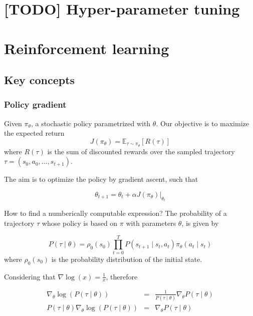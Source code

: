 \documentclass[12pt, english]{article}
\begin{document}
\section{[TODO] Hyper-parameter tuning}




\section{Reinforcement learning}

\subsection{Key concepts}

\subsubsection{Policy gradient}

Given $\pi_\theta$, a stochastic policy parametrized with $\theta$. Our objective is to maximize the expected return
\begin{equation}
  \label{eqn_expected_return}
  J(\pi_\theta) = \mathbb{E}_{\tau \sim \pi_\theta} [R(\tau)]
\end{equation}
%
where $R(\tau)$ is the sum of discounted rewards over the sampled trajectory $\tau = (s_0, a_0, \dots, s_{t+1})$.

The aim is to optimize the policy by gradient ascent, such that

\begin{equation}
  \theta_{t+1} = \theta_t + \alpha J(\pi_\theta)\Bigr|_{\theta_t}
\end{equation}

How to find a numberically computable expression? The probability of a trajectory $\tau$ whose policy is based on $\pi$ with parameters $\theta$, is given by

\begin{equation}
  \label{eqn_trajectory_probability}
  P(\tau \mid \theta) = \rho_0 (s_0) \prod_{t=0}^T P(s_{t+1} \mid s_t, a_t) \pi_\theta (a_t \mid s_t)
\end{equation}
%
where $\rho_0 (s_0)$ is the probability distribution of the initial state.

Considering that $\nabla \log (x) = \frac{1}{x}$, therefore

\begin{eqnarray*}
  \nabla_\theta \log (P(\tau \mid \theta)) &=& \frac{1}{P(\tau \mid \theta)} \nabla_\theta P(\tau \mid \theta) \\ \nonumber
  P(\tau \mid \theta) \nabla_\theta \log (P(\tau \mid \theta)) &=& \nabla_\theta P(\tau \mid \theta)
\end{eqnarray*}
\end{document}
